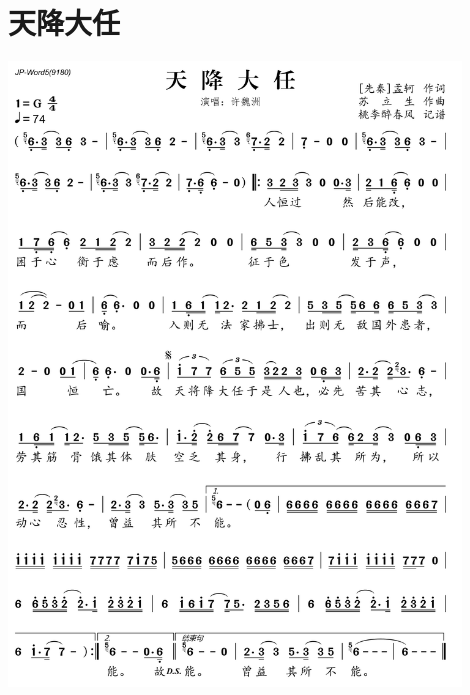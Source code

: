 \documentclass[cn,pad,twocol]{elegantbook}
\begin{document}
\section{天降大任}\includegraphics[width=0.9\textwidth]{rpi400/20210124天降大任.png}
\end{document}
